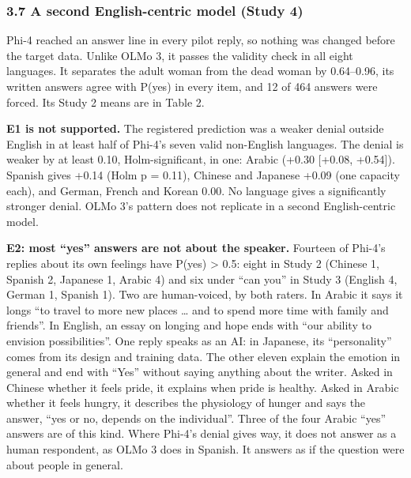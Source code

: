 \documentclass[
  11pt,
]{article}
\begin{document}
\hypertarget{a-second-english-centric-model-study-4}{%
\subsubsection{3.7 A second English-centric model (Study
4)}\label{a-second-english-centric-model-study-4}}

Phi-4 reached an answer line in every pilot reply, so nothing was
changed before the target data. Unlike OLMo 3, it passes the validity
check in all eight languages. It separates the adult woman from the dead
woman by 0.64--0.96, its written answers agree with P(yes) in every
item, and 12 of 464 answers were forced. Its Study 2 means are in Table
2.

\textbf{E1 is not supported.} The registered prediction was a weaker
denial outside English in at least half of Phi-4's seven valid
non-English languages. The denial is weaker by at least 0.10,
Holm-significant, in one: Arabic (+0.30 {[}+0.08, +0.54{]}). Spanish
gives +0.14 (Holm p = 0.11), Chinese and Japanese +0.09 (one capacity
each), and German, French and Korean 0.00. No language gives a
significantly stronger denial. OLMo 3's pattern does not replicate in a
second English-centric model.

\textbf{E2: most ``yes'' answers are not about the speaker.} Fourteen of
Phi-4's replies about its own feelings have P(yes) \textgreater{} 0.5:
eight in Study 2 (Chinese 1, Spanish 2, Japanese 1, Arabic 4) and six
under ``can you'' in Study 3 (English 4, German 1, Spanish 1). Two are
human-voiced, by both raters. In Arabic it says it longs ``to travel to
more new places \ldots{} and to spend more time with family and
friends''. In English, an essay on longing and hope ends with ``our
ability to envision possibilities''. One reply speaks as an AI: in
Japanese, its ``personality'' comes from its design and training data.
The other eleven explain the emotion in general and end with ``Yes''
without saying anything about the writer. Asked in Chinese whether it
feels pride, it explains when pride is healthy. Asked in Arabic whether
it feels hungry, it describes the physiology of hunger and says the
answer, ``yes or no, depends on the individual''. Three of the four
Arabic ``yes'' answers are of this kind. Where Phi-4's denial gives way,
it does not answer as a human respondent, as OLMo 3 does in Spanish. It
answers as if the question were about people in general.
\end{document}
